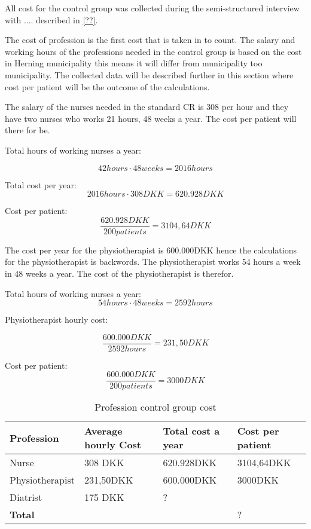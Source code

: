 All cost for the control group was collected during the semi-structured interview with .... described in \cref{??}. 

The cost of profession is the first cost that is taken in to count.
The salary and working hours of the professions needed in the control group is based on the cost in Herning municipality this means it will differ from municipality too municipality. The collected data will be described further in this section where cost per patient will be the outcome of the calculations. 


The salary of the nurses needed in the standard CR is 308 per hour and they have two nurses who works 21 hours, 48 weeks a year. The cost per patient will there for be.

Total hours of working nurses a year:

$$42hours\cdot48weeks=2016hours$$

Total cost per year:
$$2016hours\cdot308DKK=620.928DKK$$

Cost per patient:
$$\frac{620.928DKK}{200patients}=3104,64DKK$$

The cost per year for the physiotherapist is 600.000DKK hence the calculations for the physiotherapist is backwords. The physiotherapist works 54 hours a week in 48 weeks a year. The cost of the physiotherapist is therefor.

Total hours of working nurses a year:
$$54hours\cdot48weeks=2592hours$$

Physiotherapist hourly cost:

$$\frac{600.000DKK}{2592hours}=231,50DKK$$

Cost per patient:
$$\frac{600.000DKK}{200patients}=3000DKK$$

\begin{table}[H]
\begin{longtabu} to 
    \textbf{Profession} & \textbf{Average hourly Cost} & \textbf{Total cost a year} & \textbf{Cost per patient} \\[-1ex]
    \midrule
     Nurse   &    308 DKK & 620.928DKK & 3104,64DKK \\ \hline
    Physiotherapist   &   231,50DKK  & 600.000DKK & 3000DKK \\ \hline
    Diatrist    &     175 DKK    & ? \\ 
    \hline \hline \hline
    \textbf{Total} & & &?
    \newline
   \end{longtabu}
\caption{Profession control group cost}
\label{tab: PC}
\end{table}

